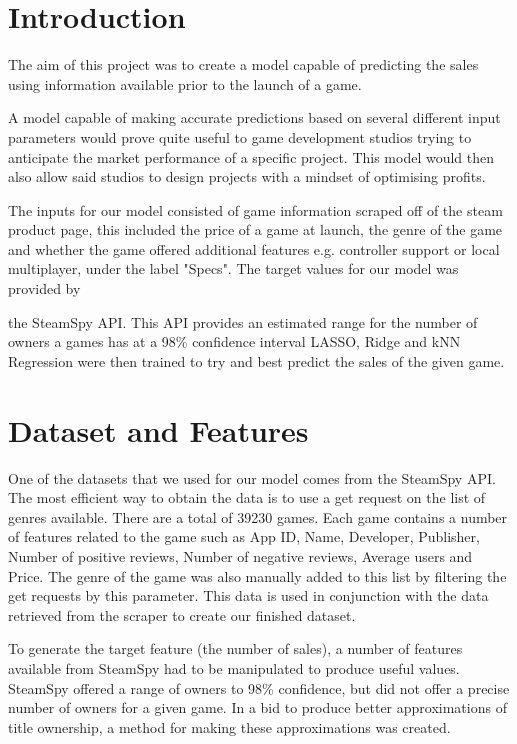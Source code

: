 \section{Introduction}
The aim of this project was to create a model capable of predicting the sales using information available prior to the launch of a game.

A model capable of making accurate predictions based on several different input parameters would prove quite useful to game development studios trying to anticipate the market performance of a specific project. This model would then also allow said studios to design projects with a mindset of optimising profits. 

The inputs for our model consisted of game information scraped off of the steam product page, this included the price of a game at launch, the genre of the game and whether the game offered additional features e.g. controller support or local multiplayer, under the label "Specs". The target values for our model was provided by

the SteamSpy API. This API provides an estimated range for the number of owners a games has at a 98\% confidence interval
LASSO, Ridge and kNN Regression were then trained to try and best predict the sales of the given game.

\section{Dataset and Features}

One of the datasets that we used for our model comes from the SteamSpy API. The most efficient way to obtain the data is to use a get request on the list of genres available. There are a total of 39230 games. Each game contains a number of features related to the game such as App ID, Name, Developer, Publisher, Number of positive reviews, Number of negative reviews, Average users and Price. The genre of the game was also manually added to this list by filtering the get requests by this parameter. This data is used in conjunction with the data retrieved from the scraper to create our finished dataset.

To generate the target feature (the number of sales), a number of features available from SteamSpy had to be manipulated to produce useful values. SteamSpy offered a range of owners to 98\% confidence, but did not offer a precise number of owners for a given game. In a bid to produce better approximations of title ownership, a method for making these approximations was created.

